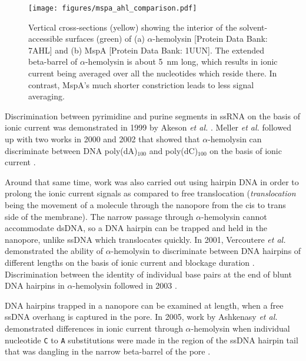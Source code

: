 \begin{figure}[h]
\begin{centering}
\texttt{[image: figures/mspa\_ahl\_comparison.pdf]}
\caption[Comparison between geometries of MspA and $\alpha$-hemolysin]{Vertical cross-sections (yellow) showing the interior of the solvent-accessible surfaces (green) of (a) $\alpha$-hemolysin [Protein Data Bank: 7AHL] and (b) MspA [Protein Data Bank: 1UUN].  The extended beta-barrel of $\alpha$-hemolysin is about \SI{5}{nm} long, which results in ionic current being averaged over all the nucleotides which reside there.  In contrast, MspA's much shorter constriction leads to less signal averaging.}
\label{fig:mspa_ahl}
\end{centering}
\end{figure}

Discrimination between pyrimidine and purine segments in ssRNA on the basis of ionic current was demonstrated in 1999 by Akeson \textit{et al.} \citep{Akeson1999}.  Meller \textit{et al.} followed up with two works in 2000 and 2002 that showed that $\alpha$-hemolysin can discriminate between DNA poly(dA)$_{100}$ and poly(dC)$_{100}$ on the basis of ionic current \citep{Meller2000, Meller2002}.

Around that same time, work was also carried out using hairpin DNA in order to prolong the ionic current signals as compared to free translocation (\textit{translocation} being the movement of a molecule through the nanopore from the cis to trans side of the membrane).  The narrow passage through $\alpha$-hemolysin cannot accommodate dsDNA, so a DNA hairpin can be trapped and held in the nanopore, unlike ssDNA which translocates quickly.  In 2001, Vercoutere \textit{et al.} demonstrated the ability of $\alpha$-hemolysin to discriminate between DNA hairpins of different lengths on the basis of ionic current and blockage duration \citep{Vercoutere2001}.  Discrimination between the identity of individual base pairs at the end of blunt DNA hairpins in $\alpha$-hemolysin followed in 2003 \citep{Vercoutere2003}.

DNA hairpins trapped in a nanopore can be examined at length, when a free ssDNA overhang is captured in the pore.  In 2005, work by Ashkenasy \textit{et al.} demonstrated differences in ionic current through $\alpha$-hemolysin when individual nucleotide \texttt{C} to \texttt{A} substitutions were made in the region of the ssDNA hairpin tail that was dangling in the narrow beta-barrel of the pore \citep{Ashkenasy2005}.


